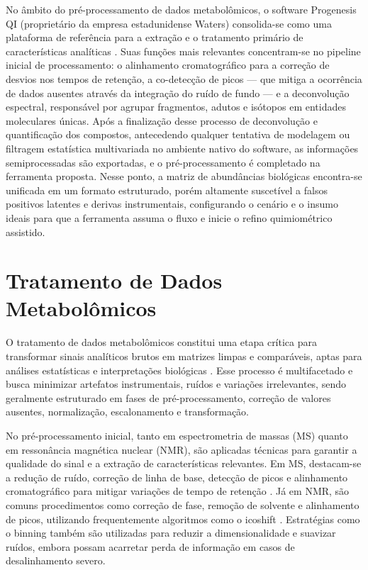 No âmbito do pré-processamento de dados metabolômicos, o software Progenesis QI (proprietário da empresa estadunidense Waters) consolida-se como uma plataforma de referência para a extração e o tratamento primário de características analíticas \cite{watersprogenesisguide}. Suas funções mais relevantes concentram-se no pipeline inicial de processamento: o alinhamento cromatográfico para a correção de desvios nos tempos de retenção, a co-detecção de picos — que mitiga a ocorrência de dados ausentes através da integração do ruído de fundo — e a deconvolução espectral, responsável por agrupar fragmentos, adutos e isótopos em entidades moleculares únicas. Após a finalização desse processo de deconvolução e quantificação dos compostos, antecedendo qualquer tentativa de modelagem ou filtragem estatística multivariada no ambiente nativo do software, as informações semiprocessadas são exportadas, e o pré-processamento é completado na ferramenta proposta. Nesse ponto, a matriz de abundâncias biológicas encontra-se unificada em um formato estruturado, porém altamente suscetível a falsos positivos latentes e derivas instrumentais, configurando o cenário e o insumo ideais para que a ferramenta assuma o fluxo e inicie o refino quimiométrico assistido. 

\section{\textbf{Tratamento de Dados Metabolômicos}}

O tratamento de dados metabolômicos constitui uma etapa crítica para transformar sinais analíticos brutos em matrizes limpas e comparáveis, aptas para análises estatísticas e interpretações biológicas \cite{datanor,sun2024pretreating}. Esse processo é multifacetado e busca minimizar artefatos instrumentais, ruídos e variações irrelevantes, sendo geralmente estruturado em fases de pré-processamento, correção de valores ausentes, normalização, escalonamento e transformação.

No pré-processamento inicial, tanto em espectrometria de massas (MS) quanto em ressonância magnética nuclear (NMR), são aplicadas técnicas para garantir a qualidade do sinal e a extração de características relevantes. Em MS, destacam-se a redução de ruído, correção de linha de base, detecção de picos e alinhamento cromatográfico para mitigar variações de tempo de retenção \cite{sun2024pretreating}. Já em NMR, são comuns procedimentos como correção de fase, remoção de solvente e alinhamento de picos, utilizando frequentemente algoritmos como o icoshift \cite{LILAND2011827}. Estratégias como o binning também são utilizadas para reduzir a dimensionalidade e suavizar ruídos, embora possam acarretar perda de informação em casos de desalinhamento severo.

